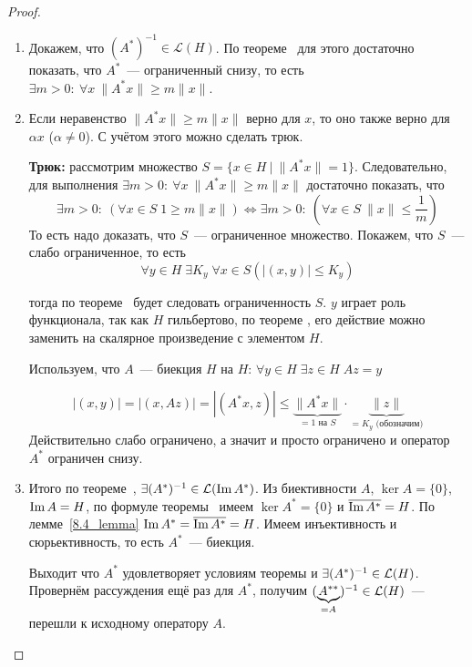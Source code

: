 \begin{proof}  %
    \begin{enumerate}
        \item Докажем, что $(A^*)^{-1} \in \mathcal{L}(H)$. По теореме~ для этого достаточно показать, что
        $A^*$~--- ограниченный снизу, то есть 
        $\exists m > 0:\ \forall x \ \|A^* x\| \geqslant m \|x\|$.
        \item Если неравенство $\|A^* x\| \geqslant m \|x\|$ верно для $x$, то оно также верно для $\alpha x$ ($\alpha \neq 0$). С учётом этого можно сделать трюк.

        \textbf{Трюк:} рассмотрим множество 
        $S = \{x \in H \: | \: \|A^*x\| = 1\}$. Следовательно, для выполнения $\exists m > 0:\ \forall x \ \|A^* x\| \geqslant m \|x\|$ достаточно показать, что
        \[\exists m > 0\!:\: \left(\forall x \in S \; 1 \geqslant m \|x\| \right) \Longleftrightarrow \exists m > 0\!:\: \left(\forall x \in S\: \|x\| \leqslant \frac{1}{m} \right)\]
        То есть надо доказать, что $S$~--- ограниченное множество.
        Покажем, что $S$~--- слабо ограниченное, то есть
        \[
        \forall y \in H\; \exists K_y\; \forall x \in S \left(|(x, y)| \leqslant K_y \right)
        \]
        
        тогда по теореме~ будет следовать ограниченность $S$. \(y\) играет роль функционала, так как $H$ гильбертово, по теореме , его действие можно заменить на скалярное произведение с элементом $H$.

        Используем, что $A$~--- биекция $H$ на $H$: $\forall y \in H \; \exists z \in H \; Az = y$

        \[ |(x, y)| = |(x, Az)| = |(A^*x, z)| \leq \underbrace{\|A^* x\|}_{=1\text{ на $S$}} \cdot \underbrace{\|z\|}_{=K_y\text{ (обозначим)}}\]
        Действительно слабо ограничено, а значит и просто ограничено и оператор $A^*$ ограничен снизу.
        \item Итого по теореме~, $\exists (A^*)^{-1} \in \mathcal{L}(\operatorname{Im} A^*)$. 
        Из биективности $A$, $\ker A = \{0\}$, $\operatorname{Im} A = H$, по формуле теоремы~ имеем 
            $\ker A^* = \{0\}$ и $\overline{\operatorname{Im} A^*} = H$.
        По лемме~\ref{8.4_lemma} $\operatorname{Im} A^* = \overline{\operatorname{Im} A^*} = H$. Имеем инъективность и сюрьективность, то есть $A^*$~--- биекция.
        
        Выходит что $A^*$ удовлетворяет условиям теоремы и $\exists (A^*)^{-1} \in \mathcal{L}(H)$.
        Провернём рассуждения ещё раз для $A^*$, получим $(\underbrace{A^{**}}_{=A})^{-1} \in \mathcal{L}(H)$~--- перешли к исходному оператору $A$. 
    \end{enumerate}
\end{proof}